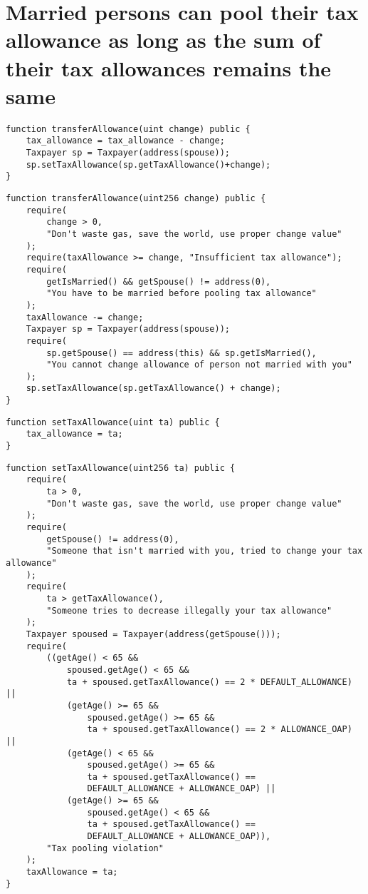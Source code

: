 \documentclass{article}
\begin{document}
\section{Married persons can pool their tax allowance as long as the sum of their tax allowances remains the same}
\begin{verbatim}
function transferAllowance(uint change) public {
    tax_allowance = tax_allowance - change;
    Taxpayer sp = Taxpayer(address(spouse));
    sp.setTaxAllowance(sp.getTaxAllowance()+change);
}
\end{verbatim}
\begin{verbatim}
function transferAllowance(uint256 change) public {
    require(
        change > 0,
        "Don't waste gas, save the world, use proper change value"
    );
    require(taxAllowance >= change, "Insufficient tax allowance");
    require(
        getIsMarried() && getSpouse() != address(0),
        "You have to be married before pooling tax allowance"
    );
    taxAllowance -= change;
    Taxpayer sp = Taxpayer(address(spouse));
    require(
        sp.getSpouse() == address(this) && sp.getIsMarried(),
        "You cannot change allowance of person not married with you"
    );
    sp.setTaxAllowance(sp.getTaxAllowance() + change);
}
\end{verbatim}
\begin{verbatim}
function setTaxAllowance(uint ta) public {
    tax_allowance = ta;
}
\end{verbatim}

\begin{verbatim}
function setTaxAllowance(uint256 ta) public {
    require(
        ta > 0,
        "Don't waste gas, save the world, use proper change value"
    );
    require(
        getSpouse() != address(0),
        "Someone that isn't married with you, tried to change your tax allowance"
    );
    require(
        ta > getTaxAllowance(),
        "Someone tries to decrease illegally your tax allowance"
    );
    Taxpayer spoused = Taxpayer(address(getSpouse()));
    require(
        ((getAge() < 65 &&
            spoused.getAge() < 65 &&
            ta + spoused.getTaxAllowance() == 2 * DEFAULT_ALLOWANCE) ||
            (getAge() >= 65 &&
                spoused.getAge() >= 65 &&
                ta + spoused.getTaxAllowance() == 2 * ALLOWANCE_OAP) ||
            (getAge() < 65 &&
                spoused.getAge() >= 65 &&
                ta + spoused.getTaxAllowance() ==
                DEFAULT_ALLOWANCE + ALLOWANCE_OAP) ||
            (getAge() >= 65 &&
                spoused.getAge() < 65 &&
                ta + spoused.getTaxAllowance() ==
                DEFAULT_ALLOWANCE + ALLOWANCE_OAP)),
        "Tax pooling violation"
    );
    taxAllowance = ta;
}
\end{verbatim}
\end{document}
